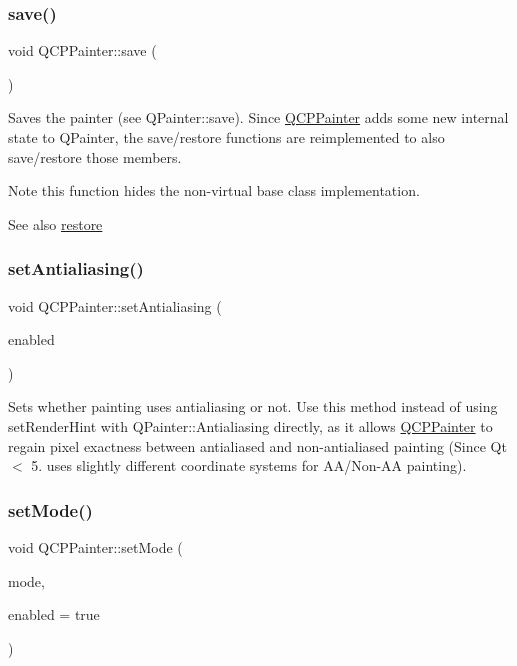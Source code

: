 \subsubsection{\texorpdfstring{save()}{save()}}
{\footnotesize\ttfamily void Q\+C\+P\+Painter\+::save (\begin{DoxyParamCaption}{ }\end{DoxyParamCaption})}

Saves the painter (see Q\+Painter\+::save). Since \mbox{\hyperlink{class_q_c_p_painter}{Q\+C\+P\+Painter}} adds some new internal state to Q\+Painter, the save/restore functions are reimplemented to also save/restore those members.

\begin{DoxyNote}{Note}
this function hides the non-\/virtual base class implementation.
\end{DoxyNote}
\begin{DoxySeeAlso}{See also}
\mbox{\hyperlink{class_q_c_p_painter_a64908e6298d5bbd83457dc987cc3a022}{restore}} 
\end{DoxySeeAlso}
\mbox{\label{class_q_c_p_painter_aaba1deb9188244d9ea65b035112b4d05}} 
\subsubsection{\texorpdfstring{set\+Antialiasing()}{setAntialiasing()}}
{\footnotesize\ttfamily void Q\+C\+P\+Painter\+::set\+Antialiasing (\begin{DoxyParamCaption}\item[{bool}]{enabled }\end{DoxyParamCaption})}

Sets whether painting uses antialiasing or not. Use this method instead of using set\+Render\+Hint with Q\+Painter\+::\+Antialiasing directly, as it allows \mbox{\hyperlink{class_q_c_p_painter}{Q\+C\+P\+Painter}} to regain pixel exactness between antialiased and non-\/antialiased painting (Since Qt $<$ 5. uses slightly different coordinate systems for A\+A/\+Non-\/\+AA painting). \mbox{\label{class_q_c_p_painter_af6b1f7d2bbc548b10aa55d8b6ad49577}} 
\subsubsection{\texorpdfstring{set\+Mode()}{setMode()}}
{\footnotesize\ttfamily void Q\+C\+P\+Painter\+::set\+Mode (\begin{DoxyParamCaption}\item[{\mbox{\hyperlink{class_q_c_p_painter_a156cf16444ff5e0d81a73c615fdb156d}{Q\+C\+P\+Painter\+::\+Painter\+Mode}}}]{mode,  }\item[{bool}]{enabled = {\ttfamily true} }\end{DoxyParamCaption})}

